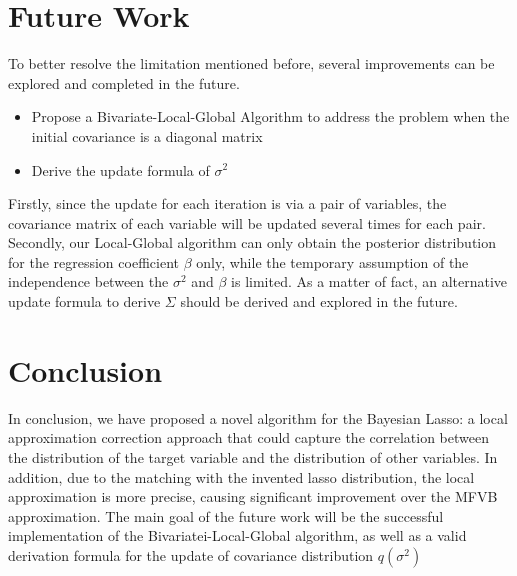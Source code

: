 \section{Future Work}
To better resolve the limitation mentioned before, several improvements can be explored and completed in the future.
\begin{itemize}
	\item Propose a Bivariate-Local-Global Algorithm to address the problem when the initial covariance is a diagonal matrix
	\item Derive the update formula of $\sigma^2$
\end{itemize}
Firstly, since the update for each iteration is via a pair of variables, the covariance matrix of each variable will be updated several times for each pair.
Secondly, our Local-Global algorithm can only obtain the posterior distribution for the regression coefficient $\beta$ only, while the temporary assumption of the independence between the $\sigma^2$ and $\beta$ is limited. As a matter of fact, an alternative update formula to derive $\Sigma$ should be derived and explored in the future.

\section{Conclusion}
In conclusion, we have proposed a novel algorithm for the Bayesian Lasso: a local approximation correction approach that could capture the correlation between the distribution of the target variable and the distribution of other variables. In addition, due to the matching with the invented lasso distribution, the local approximation is more precise, causing significant improvement over the MFVB approximation. The main goal of the future work will be the successful implementation of the Bivariatei-Local-Global algorithm, as well as a valid derivation formula for the update of covariance distribution $q(\sigma^2)$


